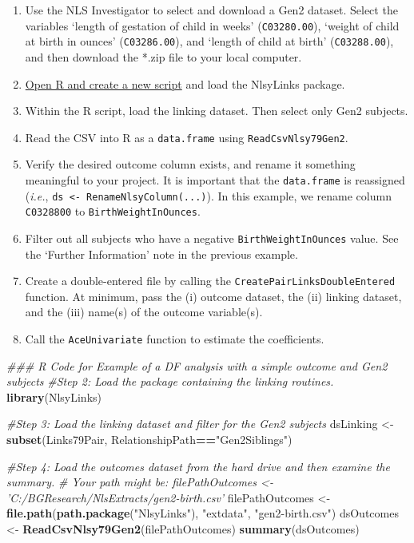 \documentclass[smallextended]{svjour3}       %
\newenvironment{Shaded}{\begin{snugshade}}{\end{snugshade}}
\newcommand{\CommentTok}[1]{\textcolor[rgb]{0.56,0.35,0.01}{\textit{#1}}}
\newcommand{\KeywordTok}[1]{\textcolor[rgb]{0.13,0.29,0.53}{\textbf{#1}}}
\newcommand{\NormalTok}[1]{#1}
\newcommand{\OperatorTok}[1]{\textcolor[rgb]{0.81,0.36,0.00}{\textbf{#1}}}
\newcommand{\StringTok}[1]{\textcolor[rgb]{0.31,0.60,0.02}{#1}}
\begin{document}
\begin{enumerate}
\def\labelenumi{\arabic{enumi}.}
\item
  Use the NLS Investigator to select and download a Gen2 dataset. Select
  the variables `length of gestation of child in weeks'
  (\texttt{C03280.00}), `weight of child at birth in ounces'
  (\texttt{C03286.00}), and `length of child at birth'
  (\texttt{C03288.00}), and then download the *.zip file to your local
  computer.
\item
  \protect\hyperlink{appendix-creating-and-saving-r-scripts}{Open R and
  create a new script} and load the NlsyLinks package.
\item
  Within the R script, load the linking dataset. Then select only Gen2
  subjects.
\item
  Read the CSV into R as a \texttt{data.frame} using
  \texttt{ReadCsvNlsy79Gen2}.
\item
  Verify the desired outcome column exists, and rename it something
  meaningful to your project. It is important that the
  \texttt{data.frame} is reassigned (\emph{i.e.},
  \texttt{ds\ \textless{}-\ RenameNlsyColumn(...)}). In this example, we
  rename column \texttt{C0328800} to \texttt{BirthWeightInOunces}.
\item
  Filter out all subjects who have a negative
  \texttt{BirthWeightInOunces} value. See the `Further Information' note
  in the previous example.
\item
  Create a double-entered file by calling the
  \texttt{CreatePairLinksDoubleEntered} function. At minimum, pass the
  (i) outcome dataset, the (ii) linking dataset, and the (iii) name(s)
  of the outcome variable(s).
\item
  Call the \texttt{AceUnivariate} function to estimate the coefficients.
\end{enumerate}

\begin{Shaded}
\begin{Highlighting}[]
\CommentTok{### R Code for Example of a DF analysis with a simple outcome and Gen2 subjects}
\CommentTok{#Step 2: Load the package containing the linking routines.}
\KeywordTok{library}\NormalTok{(NlsyLinks)}

\CommentTok{#Step 3: Load the linking dataset and filter for the Gen2 subjects}
\NormalTok{dsLinking <-}\StringTok{ }\KeywordTok{subset}\NormalTok{(Links79Pair, RelationshipPath}\OperatorTok{==}\StringTok{"Gen2Siblings"}\NormalTok{)}

\CommentTok{#Step 4: Load the outcomes dataset from the hard drive and then examine the summary.}
\CommentTok{#   Your path might be: filePathOutcomes <- 'C:/BGResearch/NlsExtracts/gen2-birth.csv'}
\NormalTok{filePathOutcomes <-}\StringTok{ }\KeywordTok{file.path}\NormalTok{(}\KeywordTok{path.package}\NormalTok{(}\StringTok{"NlsyLinks"}\NormalTok{), }\StringTok{"extdata"}\NormalTok{, }\StringTok{"gen2-birth.csv"}\NormalTok{)}
\NormalTok{dsOutcomes <-}\StringTok{ }\KeywordTok{ReadCsvNlsy79Gen2}\NormalTok{(filePathOutcomes)}
\KeywordTok{summary}\NormalTok{(dsOutcomes)}
\end{Highlighting}
\end{Shaded}
\end{document}
